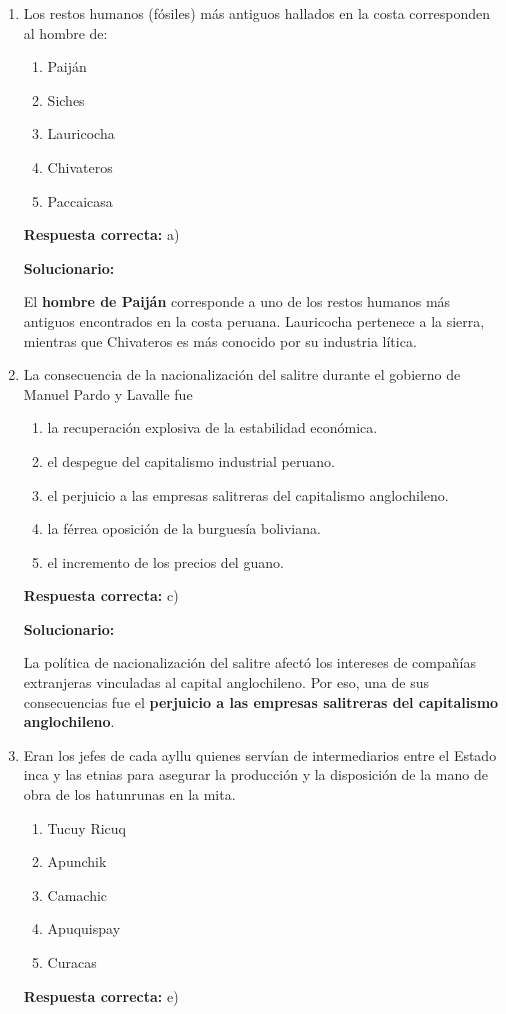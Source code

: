\begin{enumerate}[resume]
	
	\item Los restos humanos (fósiles) más antiguos hallados en la costa corresponden al hombre de:
	\begin{enumerate}[label=\alph*)]
		\item Paiján
		\item Siches
		\item Lauricocha
		\item Chivateros
		\item Paccaicasa
	\end{enumerate}
	\textbf{Respuesta correcta:} a)
	
	\vspace{2mm}
	\textbf{Solucionario:}
	
	El \textbf{hombre de Paiján} corresponde a uno de los restos humanos más antiguos encontrados en la costa peruana. Lauricocha pertenece a la sierra, mientras que Chivateros es más conocido por su industria lítica.
	
	\vspace{6mm}
	
	\item La consecuencia de la nacionalización del salitre durante el gobierno de Manuel Pardo y Lavalle fue
	\begin{enumerate}[label=\alph*)]
		\item la recuperación explosiva de la estabilidad económica.
		\item el despegue del capitalismo industrial peruano.
		\item el perjuicio a las empresas salitreras del capitalismo anglochileno.
		\item la férrea oposición de la burguesía boliviana.
		\item el incremento de los precios del guano.
	\end{enumerate}
	\textbf{Respuesta correcta:} c)
	
	\vspace{2mm}
	\textbf{Solucionario:}
	
	La política de nacionalización del salitre afectó los intereses de compañías extranjeras vinculadas al capital anglochileno. Por eso, una de sus consecuencias fue el \textbf{perjuicio a las empresas salitreras del capitalismo anglochileno}.
	
	\vspace{6mm}
	
	\item Eran los jefes de cada ayllu quienes servían de intermediarios entre el Estado inca y las etnias para asegurar la producción y la disposición de la mano de obra de los hatunrunas en la mita.
	\begin{enumerate}[label=\alph*)]
		\item Tucuy Ricuq
		\item Apunchik
		\item Camachic
		\item Apuquispay
		\item Curacas
	\end{enumerate}
	\textbf{Respuesta correcta:} e)
	

\end{enumerate}
